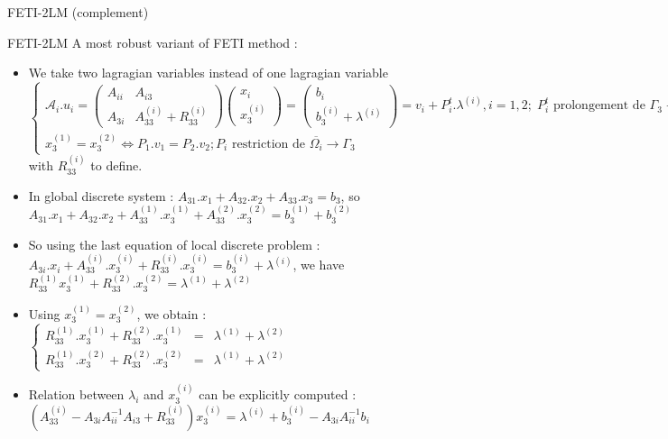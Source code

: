 \documentclass[compress,10pt,aspectratio=169]{beamer}
\begin{document}
\begin{frame}[fragile]{FETI-2LM (complement)}
  \scriptsize
  \begin{block}{FETI-2LM}
  A most robust variant of FETI method :
  \begin{itemize}
    \item We take two lagragian variables instead of one lagragian variable
    $
    \left\{
      \begin{array}{l}
        \mathcal{A}_{i}.u_{i} = 
        \left(\begin{array}{cc}
          A_{ii} & A_{i3} \\
          A_{3i} & A_{33}^{(i)} + R_{33}^{(i)}
        \end{array}\right) \left(
        \begin{array}{c} x_{i} \\ x^{(i)}_{3} 
        \end{array}\right) = \left(
        \begin{array}{c} 
          b_{i} \\ b_{3}^{(i)} + \lambda^{(i)}
        \end{array}\right) = v_{i} + P_{i}^{t}.\lambda^{(i)}, i=1,2;\; P_{i}^{t}\mbox{ prolongement de }\Gamma_{3}\rightarrow \overline{\Omega_{i}}
        \\
        x_{3}^{(1)} = x_{3}^{(2)} \Leftrightarrow P_{1}.v_{1} = P_{2}.v_{2}; P_{i}\mbox{ restriction de }\overline{\Omega_{i}}\rightarrow \Gamma_{3}
      \end{array}
    \right.
    $ with $R_{33}^{(i)}$ to define.
    \item In global discrete system : $A_{31}.x_{1} + A_{32}.x_{2} + A_{33}.x_{3} = b_{3}$, so 
    $A_{31}.x_{1} + A_{32}.x_{2} + A_{33}^{(1)}.x_{3}^{(1)} + A_{33}^{(2)}.x_{3}^{(2)} = b_{3}^{(1)} + b_{3}^{(2)}$
    \item So using the last equation of local discrete problem : 
    $A_{3i}.x_{i} + A_{33}^{(i)}.x_{3}^{(i)} + R_{33}^{(i)}.x_{3}^{(i)} = b_{3}^{(i)} + \lambda^{(i)}$, we have 
    $R_{33}^{(1)}x_{3}^{(1)} + R_{33}^{(2)}.x_{3}^{(2)} = \lambda^{(1)} + \lambda^{(2)}$
    \item Using $x_{3}^{(1)} = x_{3}^{(2)}$, we   obtain :
    $
    \left\{
      \begin{array}{lcl}
        R_{33}^{(1)}.x_{3}^{(1)} + R_{33}^{(2)}.x_{3}^{(1)} & = & \lambda^{(1)} + \lambda^{(2)} \\
        R_{33}^{(1)}.x_{3}^{(2)} + R_{33}^{(2)}.x_{3}^{(2)} & = & \lambda^{(1)} + \lambda^{(2)}
      \end{array}
    \right.
    $
    \item Relation between $\lambda_{i}$ and $x_{3}^{(i)}$ can be explicitly computed :
      $\left(A_{33}^{(i)} - A_{3i}A_{ii}^{-1}A_{i3} + R_{33}^{(i)}\right)x_{3}^{(i)} = \lambda^{(i)} + b_{3}^{(i)} - A_{3i}A_{ii}^{-1}b_{i}$
  \end{itemize}
  \end{block}
\end{frame}
\end{document}
